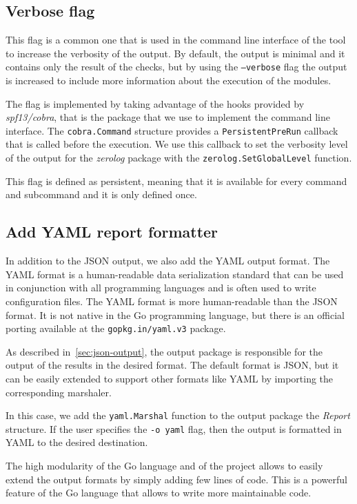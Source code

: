 \subsection{Verbose flag}

This flag is a common one that is used in the command line interface of the tool to increase the verbosity of the output. By default, the output is minimal and it contains only the result of the checks, but by using the \texttt{--verbose} flag the output is increased to include more information about the execution of the modules.

The flag is implemented by taking advantage of the hooks provided by \textit{spf13/cobra}, that is the package that we use to implement the command line interface. The \texttt{cobra.Command} structure provides a \texttt{PersistentPreRun} callback that is called before the execution. We use this callback to set the verbosity level of the output for the \textit{zerolog} package with the \texttt{zerolog.SetGlobalLevel} function.

This flag is defined as persistent, meaning that it is available for every command and subcommand and it is only defined once.

\subsection{Add YAML report formatter}

In addition to the JSON output, we also add the YAML output format. The YAML format is a human-readable data serialization standard that can be used in conjunction with all programming languages and is often used to write configuration files. The YAML format is more human-readable than the JSON format. It is not native in the Go programming language, but there is an official porting available at the \texttt{gopkg.in/yaml.v3} package.

As described in~\cref{sec:json-output}, the output package is responsible for the output of the results in the desired format. The default format is JSON, but it can be easily extended to support other formats like YAML by importing the corresponding marshaler.

In this case, we add the \texttt{yaml.Marshal} function to the output package the \textit{Report} structure. If the user specifies the \texttt{-o yaml} flag, then the output is formatted in YAML to the desired destination.

The high modularity of the Go language and of the project allows to easily extend the output formats by simply adding few lines of code. This is a powerful feature of the Go language that allows to write more maintainable code.

